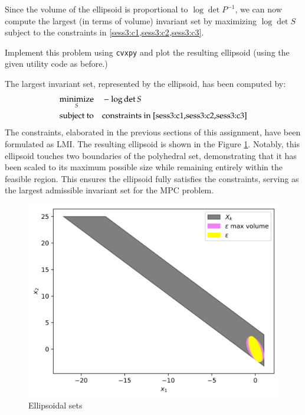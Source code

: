 \documentclass[]{article}
\begin{document}
\begin{assignment}
	Since the volume of the ellipsoid is proportional to $\log \det P^{-1}$, we can now 
	compute the largest (in terms of volume) invariant set by maximizing $\log \det S$ subject 
	to the constraints in \cref{sess3:c1,sess3:c2,sess3:c3}. 
	
	Implement this problem using \texttt{cvxpy} and plot the resulting ellipsoid (using the given utility code as before.)
\end{assignment}
\begin{flushleft}
	The largest invariant set, represented by the ellipsoid, has been computed by: 
	\begin{equation}
		\begin{aligned}
			& \underset{S}{\text{minimize}}
			& & -\log \det S \\
			& \text{subject to}
			& & \text{constraints in \cref{sess3:c1,sess3:c2,sess3:c3}}
		\end{aligned}
	\end{equation} 
	The constraints, elaborated in the previous sections of this assignment, have been formulated as LMI. The resulting ellipsoid is shown in the Figure \ref{fig:assignment3_7}. 
	Notably, this ellipsoid touches two boundaries of the polyhedral set, demonstrating that it has been scaled to its maximum possible size while remaining entirely within the feasible region. 
	This ensures the ellipsoid fully satisfies the constraints, serving as the largest admissible invariant set for the MPC problem.
\end{flushleft}
\begin{figure}[H]
    \centering
    \begin{minipage}{0.7\textwidth}
        \centering
        \includegraphics[width=\textwidth]{images/Assignment_37.png}
        \caption{Ellipsoidal sets}
        \label{fig:assignment3_7}
    \end{minipage}
\end{figure}
\end{document}
